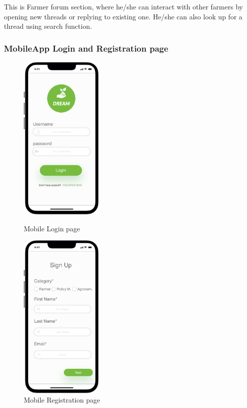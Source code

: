 This is Farmer forum section, where he/she can interact with other farmers by opening new threads or replying to existing one.
He/she can also look up for a thread using search function.

\subsubsection{MobileApp Login and Registration page}

\begin{figure}[H]
  \begin{minipage}{0.5\textwidth}
  \centering
    \includegraphics[width=40mm,scale=0.9]{./Images//Mocks/Mobile/Login.png}
    \caption{Mobile Login page}
    \end{minipage}
\hfill
   \begin{minipage}{0.5\textwidth}
     \centering
     \includegraphics[width=40mm,scale=0.9]{./Images//Mocks/Mobile/Registration.png}
     \caption{Mobile Registration page}
   \end{minipage}
\end{figure}

